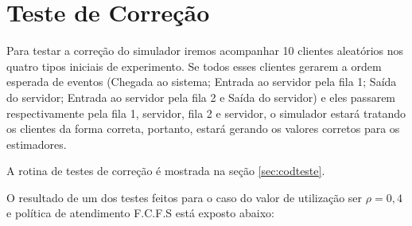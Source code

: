 \chapter{Teste de Correção}
\label{sec:teste}

Para testar a correção do simulador iremos acompanhar 10 clientes aleatórios nos quatro tipos iniciais de experimento. Se todos esses clientes gerarem a ordem esperada de eventos (Chegada ao sistema; Entrada ao servidor pela fila 1; Saída do servidor; Entrada ao servidor pela fila 2 e Saída do servidor) e eles passarem respectivamente pela fila 1, servidor, fila 2 e servidor, o simulador estará tratando os clientes da forma correta, portanto, estará gerando os valores corretos para os estimadores.

A rotina de testes de correção é mostrada na seção \ref{sec:codteste}.

O resultado de um dos testes feitos para o caso do valor de utilização ser $\rho=0,4$ e política de atendimento F.C.F.S está exposto abaixo:

